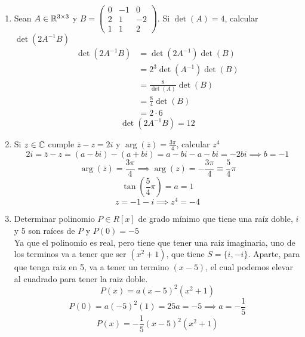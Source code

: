 \documentclass[../practica.root.tex]{subfiles}
\begin{document}
\begin{enumerate}
    \item Sean $A \in \mathbb{R}^{3\times3}$ y $B = \begin{pmatrix}
                  0 & -1 & 0 \\ 2 & 1 & -2 \\ 1 & 1 & 2
              \end{pmatrix}$. Si $\det(A) = 4$, calcular $\det(2A^{-1}B)$ %
          \begin{align*}
              \det(2A^{-1}B) & = \det(2A^{-1})\det(B)     \\
                             & = 2^3\det(A^{-1})\det(B)   \\
                             & = \frac{8}{\det(A)}\det(B) \\
                             & = \frac{8}{4}\det(B)       \\
                             & = 2\cdot 6
          \end{align*}
          \[ \boxed{\det(2A^{-1}B) = 12} \]

    \item Si $z \in \mathbb{C}$ cumple $\overline{z} - z = 2i$ y $\arg(\overline{z}) = \frac{3\pi}{4}$, calcular $z^4$
          \[
              2i = \overline{z} - z = (a - bi) - (a + bi) = a - bi - a - bi = -2bi \implies b = -1
          \] \[
              \arg(\overline{z}) = \frac{3\pi}{4} \implies \arg(z) = -\frac{3\pi}{4} \equiv \frac{5}{4}\pi
          \]
          \[
              \tan\left(\frac{5}{4}\pi\right) = a = 1
          \] \[
              z = -1 - i \implies \boxed{z^4 = -4}
          \]


    \item Determinar polinomio $P \in R[x]$ de grado mínimo que tiene una raíz doble, $i$ y $5$ son raíces de $P$ y $P(0) = -5$ \\
          Ya que el polinomio es real, pero tiene que tener una raiz imaginaria, uno de los terminos va a tener que ser $(x^2 + 1)$, que tiene $S = \{i, -i\}$. Aparte, para que tenga raiz en 5, va a tener un termino $(x-5)$, el cual podemos elevar al cuadrado para tener la raiz doble.
          \[ P(x) = a(x-5)^2(x^2+1) \]
          \[ P(0) = a(-5)^2(1) = 25a = -5 \implies a = -\frac{1}{5} \]
          \[ P(x) = -\frac{1}{5}(x-5)^2(x^2+1) \]


\end{enumerate}
\end{document}
